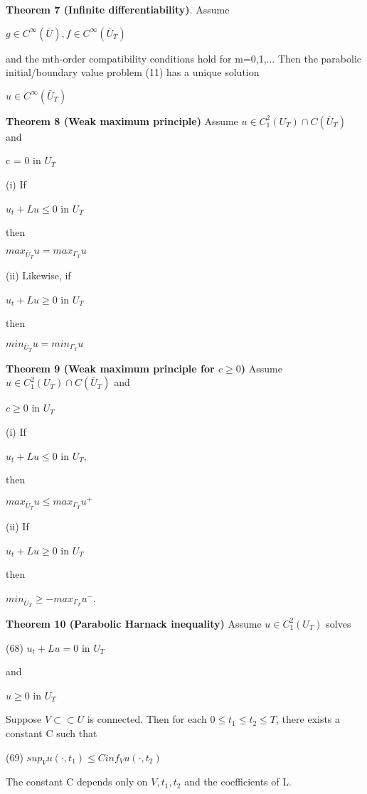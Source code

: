 \documentclass{article}
\newcommand\tab[1][1cm]{\hspace*{#1}}
\begin{document}
\textbf {Theorem 7 (Infinite differentiability)}. Assume
\begin{center}
$g \in C^{\infty}(\bar{U}), f \in C^{\infty}(\bar{U}_T)$
\end{center}
and the mth-order compatibility conditions hold for m=0,1,... Then the parabolic initial/boundary value problem (11) has a unique solution
\begin{center}
$u \in C^{\infty}(\bar{U}_T)$
\end{center}

\textbf {Theorem 8 (Weak maximum principle)} Assume $u \in C^2_1(U_T) \cap C(\bar{U}_T)$ and 
\begin{center}
c = 0 \tab in $U_T$
\end{center}
\tab (i) If
\begin{center}
$u_t + Lu \leq 0$ \tab in $U_T$
\end{center}
then
\begin{center}
$max_{\bar{U}_{T}} u = max_{\Gamma_{T}}u$
\end{center}
\tab (ii) Likewise, if
\begin{center}
$u_t + Lu \geq 0$ \tab in $U_T$
\end{center}
then 
\begin{center}
$min_{\bar{U}_{T}} u = min_{\Gamma_{T}} u$
\end{center}

\textbf {Theorem 9 (Weak maximum principle for $c \geq 0$)} Assume $u \in C_1^2(U_T) \cap C(\bar{U}_{T})$ and 
\begin{center}
$c \geq 0$ \tab in $U_T$
\end{center}
\tab (i) If 
\begin{center}
$u_t + Lu \leq 0$ \tab in $U_T$,
\end{center}
then
\begin{center}
$max_{\bar{U}_T} u \leq max_{\Gamma_{T}} u^+$
\end{center}
\tab (ii) If
\begin{center}
$u_t + Lu \geq 0$ \tab in $U_T$
\end{center}
then
\begin{center}
$min_{\bar{U}_T} \geq - max_{\Gamma_{T}} u^-$.
\end{center}

\textbf {Theorem 10 (Parabolic Harnack inequality)} Assume $u \in C_1^2(U_T)$ solves
\begin{center}
(68) \tab $u_t + Lu = 0$ \tab in $U_T$
\end{center}
and
\begin{center}
$u \geq 0$ \tab in $U_T$
\end{center}
Suppose $V \subset \subset U$ is connected. Then for each $0 \leq t_1 \leq t_2 \leq T$, there exists a constant C such that
\begin{center}
(69) \tab $sup_{V} u(\cdot, t_1) \leq C inf_{V} u (\cdot, t_2)$
\end{center}
The constant C depends only on $V, t_1, t_2$ and the coefficients of L.
\end{document}
